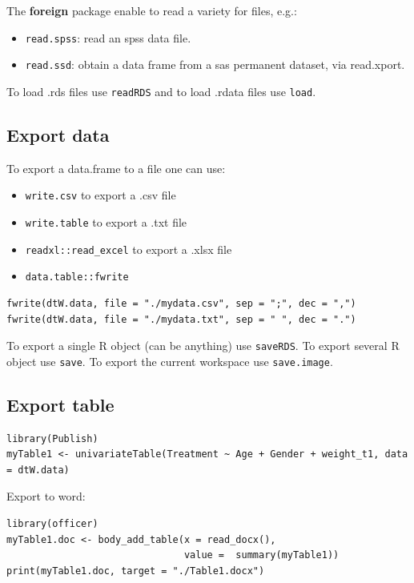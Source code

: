 \documentclass{article}
\begin{document}
\bigskip

The \textbf{foreign} package enable to read a variety for files, e.g.:
\begin{itemize}
\item \texttt{read.spss}: read an spss data file.
\item \texttt{read.ssd}: obtain a data frame from a sas permanent dataset, via read.xport.
\end{itemize}

\bigskip

To load .rds files use \texttt{readRDS} and to load .rdata files use \texttt{load}.

\subsection{Export data}
\label{sec:org07d4b21}

To export a data.frame to a file one can use:
\begin{itemize}
\item \texttt{write.csv} to export a .csv file
\item \texttt{write.table} to export a .txt file
\item \texttt{readxl::read\_excel} to export a .xlsx file
\item \texttt{data.table::fwrite}
\end{itemize}
\lstset{language=r,label= ,caption= ,captionpos=b,numbers=none}
\begin{lstlisting}
fwrite(dtW.data, file = "./mydata.csv", sep = ";", dec = ",")
fwrite(dtW.data, file = "./mydata.txt", sep = " ", dec = ".")
\end{lstlisting}

To export a single R object (can be anything) use \texttt{saveRDS}.
To export several R object use \texttt{save}.
To export the current workspace use \texttt{save.image}.

\subsection{Export table}
\label{sec:orgf2e97d6}

\lstset{language=r,label= ,caption= ,captionpos=b,numbers=none}
\begin{lstlisting}
library(Publish)
myTable1 <- univariateTable(Treatment ~ Age + Gender + weight_t1, data = dtW.data)
\end{lstlisting}

Export to word:
\lstset{language=r,label= ,caption= ,captionpos=b,numbers=none}
\begin{lstlisting}
library(officer)
myTable1.doc <- body_add_table(x = read_docx(), 
							   value =  summary(myTable1)) 
print(myTable1.doc, target = "./Table1.docx")
\end{lstlisting}
\end{document}
